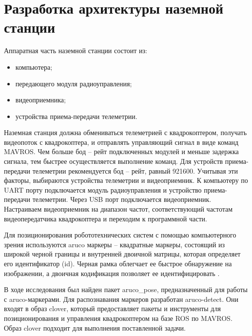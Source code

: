 \section{Разработка архитектуры наземной станции}
Аппаратная часть наземной станции состоит из:
\begin{itemize}
	\item компьютера;
	\item передающего модуля радиоуправления;
	\item видеоприемника;
	\item устройства приема-передачи телеметрии.
\end{itemize}
Наземная станция должна обмениваться телеметрией с квадрокоптером, получать видеопоток с квадрокоптера, и отправлять управляющий сигнал в виде команд MAVROS. Чем больше бод -- рейт подключенных модулей и меньше задержка сигнала, тем быстрее осуществляется выполнение команд. Для устройств приема-передачи телеметрии рекомендуется бод -- рейт, равный 921600. Учитывая эти факторы, выбираются устройства телеметрии и видеоприемник.
К компьютеру по UART порту подключается модуль радиоуправления и устройство приема-передачи телеметрии. Через USB порт подключается видеоприемник. Настраиваем видеоприемник на диапазон частот, соответствующий частотам видеопередатчика квадрокоптера и переходим к программной части.

Для позиционирования робототехнических систем с помощью компьютерного зрения используются aruco маркеры -- квадратные маркеры, состоящий из широкой черной границы и внутренней двоичной матрицы, которая определяет его идентификатор (id). Черная рамка облегчает ее быстрое обнаружение на изображении, а двоичная кодификация позволяет ее идентифицировать \cite{opencv}.

В ходе исследования был найден пакет aruco\_pose, предназначенный для работы с aruco-маркерами. Для распознавания маркеров разработан aruco-detect. Они входят в образ clover, который предоставляет пакеты и инструменты для позиционирования и управления квадрокоптером на базе ROS по MAVROS. Образ clover подходит для выполнения поставленной задачи.

